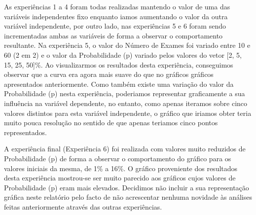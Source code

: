\documentclass{article}
\begin{document}
As experiências 1 a 4 foram todas realizadas mantendo o valor de uma das variáveis independentes fixo enquanto iamos aumentando o valor da outra variável independente, por outro lado, nas experiências 5 e 6 foram sendo incrementadas ambas as variáveis de forma a observar o comportamento resultante. Na experiência 5, o valor do Número de Exames foi variado entre 10 e 60 (2 em 2) e o valor da Probabilidade (p) variado pelos valores do vetor [2, 5, 15, 25, 50]\%. Ao visualizarmos os resultados desta experiência, conseguimos observar que a curva era agora mais suave do que no gráficos gráficos apresentados anteriormente. Como também existe uma variação do valor da Probabilidade (p) nesta experiência, poderiamos representar graficamente a sua influência na variável dependente, no entanto, como apenas iteramos sobre cinco valores distintos para esta variável independente, o gráfico que iriamos obter teria muito pouca resolução no sentido de que apenas teriamos cinco pontos representados.\par

A experiência final (Experiência 6) foi realizada com valores muito reduzidos de Probabilidade (p) de forma a observar o comportamento do gráfico para os valores iniciais da mesma, de 1\% a 16\%. O gráfico proveniente dos resultados desta experiência mostrou-se ser muito parecido aos gráficos cujos valores de Probabilidade (p) eram mais elevados. Decidimos não incluir a sua representação gráfica neste relatório pelo facto de não acrescentar nenhuma novidade às análises feitas anteriormente através das outras experiências.\par
\end{document}

